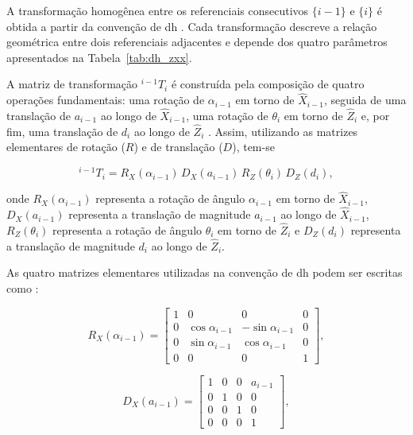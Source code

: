 A transformação homogênea entre os referenciais consecutivos $\{i-1\}$ e $\{i\}$ é obtida a partir da convenção de \gls{dh} \cite{craig2005}. 
Cada transformação descreve a relação geométrica entre dois referenciais adjacentes e depende dos quatro parâmetros apresentados na Tabela~\ref{tab:dh_zxx}.

A matriz de transformação ${}^{i-1}T_i$ é construída pela composição de quatro operações fundamentais: uma rotação de $\alpha_{i-1}$ em torno de $\hat{X}_{i-1}$, seguida de uma translação de $a_{i-1}$ ao longo de $\hat{X}_{i-1}$, uma rotação de $\theta_i$ em torno de $\hat{Z}_i$ e, por fim, uma translação de $d_i$ ao longo de $\hat{Z}_i$ \cite{craig2005}.
Assim, utilizando as matrizes elementares de rotação ($R$) e de translação ($D$), tem-se

\begin{equation}
{}^{i-1}T_i
=
R_X(\alpha_{i-1})\,D_X(a_{i-1})\,R_Z(\theta_i)\,D_Z(d_i),
\label{eq:Ti_1}
\end{equation}


onde $R_X(\alpha_{i-1})$ representa a rotação de ângulo $\alpha_{i-1}$ em torno de $\hat{X}_{i-1}$,
$D_X(a_{i-1})$ representa a translação de magnitude $a_{i-1}$ ao longo de $\hat{X}_{i-1}$,
$R_Z(\theta_i)$ representa a rotação de ângulo $\theta_i$ em torno de $\hat{Z}_i$ e
$D_Z(d_i)$ representa a translação de magnitude $d_i$ ao longo de $\hat{Z}_i$.



As quatro matrizes elementares utilizadas na convenção de \gls{dh} podem ser escritas como \cite{craig2005}:

\begin{equation}
R_X(\alpha_{i-1}) =
\begin{bmatrix}
1 & 0 & 0 & 0 \\
0 & \cos\alpha_{i-1} & -\sin\alpha_{i-1} & 0 \\
0 & \sin\alpha_{i-1} &  \cos\alpha_{i-1} & 0 \\
0 & 0 & 0 & 1
\end{bmatrix},
\end{equation}

\begin{equation}
D_X(a_{i-1}) =
\begin{bmatrix}
1 & 0 & 0 & a_{i-1} \\
0 & 1 & 0 & 0 \\
0 & 0 & 1 & 0 \\
0 & 0 & 0 & 1
\end{bmatrix},
\end{equation}


